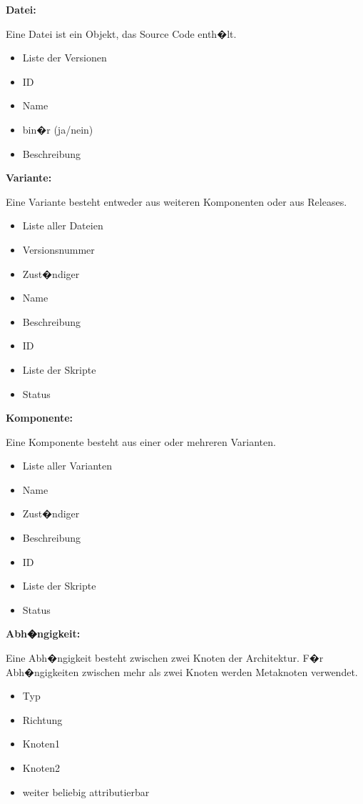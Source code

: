\textbf{Datei:}\par
Eine Datei ist ein Objekt, das Source Code enth�lt.
\begin{itemize}
\item Liste der Versionen
\item ID
\item Name
\item bin�r (ja/nein)
\item Beschreibung\newline
\end{itemize}

\textbf{Variante:}\par
Eine Variante besteht entweder aus weiteren Komponenten oder aus Releases.
\begin{itemize}
\item Liste aller Dateien
\item Versionsnummer
\item Zust�ndiger
\item Name
\item Beschreibung
\item ID
\item Liste der Skripte
\item Status\newline
\end{itemize}

\textbf{Komponente:}\par
Eine Komponente besteht aus einer oder mehreren Varianten.
\begin{itemize}
\item Liste aller Varianten
\item Name
\item Zust�ndiger
\item Beschreibung
\item ID
\item Liste der Skripte
\item Status\newline
\end{itemize}

\textbf{Abh�ngigkeit:}\par
Eine Abh�ngigkeit besteht zwischen zwei Knoten der Architektur. F�r Abh�ngigkeiten zwischen mehr als zwei Knoten werden Metaknoten verwendet.
\begin{itemize}
\item Typ
\item Richtung
\item Knoten1
\item Knoten2
\item weiter beliebig attributierbar\newline
\end{itemize}

